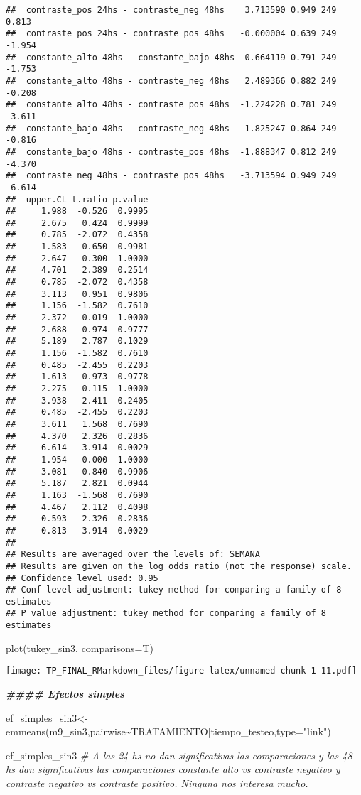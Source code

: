 \documentclass[
]{article}
\newenvironment{Shaded}{\begin{snugshade}}{\end{snugshade}}
\newcommand{\AttributeTok}[1]{\textcolor[rgb]{0.77,0.63,0.00}{#1}}
\newcommand{\CommentTok}[1]{\textcolor[rgb]{0.56,0.35,0.01}{\textit{#1}}}
\newcommand{\DocumentationTok}[1]{\textcolor[rgb]{0.56,0.35,0.01}{\textbf{\textit{#1}}}}
\newcommand{\FunctionTok}[1]{\textcolor[rgb]{0.00,0.00,0.00}{#1}}
\newcommand{\NormalTok}[1]{#1}
\newcommand{\OtherTok}[1]{\textcolor[rgb]{0.56,0.35,0.01}{#1}}
\newcommand{\SpecialCharTok}[1]{\textcolor[rgb]{0.00,0.00,0.00}{#1}}
\newcommand{\StringTok}[1]{\textcolor[rgb]{0.31,0.60,0.02}{#1}}
\begin{document}
\begin{verbatim}
##  contraste_pos 24hs - contraste_neg 48hs    3.713590 0.949 249    0.813
##  contraste_pos 24hs - contraste_pos 48hs   -0.000004 0.639 249   -1.954
##  constante_alto 48hs - constante_bajo 48hs  0.664119 0.791 249   -1.753
##  constante_alto 48hs - contraste_neg 48hs   2.489366 0.882 249   -0.208
##  constante_alto 48hs - contraste_pos 48hs  -1.224228 0.781 249   -3.611
##  constante_bajo 48hs - contraste_neg 48hs   1.825247 0.864 249   -0.816
##  constante_bajo 48hs - contraste_pos 48hs  -1.888347 0.812 249   -4.370
##  contraste_neg 48hs - contraste_pos 48hs   -3.713594 0.949 249   -6.614
##  upper.CL t.ratio p.value
##     1.988  -0.526  0.9995
##     2.675   0.424  0.9999
##     0.785  -2.072  0.4358
##     1.583  -0.650  0.9981
##     2.647   0.300  1.0000
##     4.701   2.389  0.2514
##     0.785  -2.072  0.4358
##     3.113   0.951  0.9806
##     1.156  -1.582  0.7610
##     2.372  -0.019  1.0000
##     2.688   0.974  0.9777
##     5.189   2.787  0.1029
##     1.156  -1.582  0.7610
##     0.485  -2.455  0.2203
##     1.613  -0.973  0.9778
##     2.275  -0.115  1.0000
##     3.938   2.411  0.2405
##     0.485  -2.455  0.2203
##     3.611   1.568  0.7690
##     4.370   2.326  0.2836
##     6.614   3.914  0.0029
##     1.954   0.000  1.0000
##     3.081   0.840  0.9906
##     5.187   2.821  0.0944
##     1.163  -1.568  0.7690
##     4.467   2.112  0.4098
##     0.593  -2.326  0.2836
##    -0.813  -3.914  0.0029
## 
## Results are averaged over the levels of: SEMANA 
## Results are given on the log odds ratio (not the response) scale. 
## Confidence level used: 0.95 
## Conf-level adjustment: tukey method for comparing a family of 8 estimates 
## P value adjustment: tukey method for comparing a family of 8 estimates
\end{verbatim}

\begin{Shaded}
\begin{Highlighting}[]
\FunctionTok{plot}\NormalTok{(tukey\_sin3, }\AttributeTok{comparisons=}\NormalTok{T)}
\end{Highlighting}
\end{Shaded}

\texttt{[image: TP\_FINAL\_RMarkdown\_files/figure-latex/unnamed-chunk-1-11.pdf]}

\begin{Shaded}
\begin{Highlighting}[]
\DocumentationTok{\#\#\#\# Efectos simples}

\NormalTok{ef\_simples\_sin3}\OtherTok{\textless{}{-}}\FunctionTok{emmeans}\NormalTok{(m9\_sin3,pairwise}\SpecialCharTok{\textasciitilde{}}\NormalTok{TRATAMIENTO}\SpecialCharTok{|}\NormalTok{tiempo\_testeo,}\AttributeTok{type=}\StringTok{"link"}\NormalTok{)}

\NormalTok{ef\_simples\_sin3 }\CommentTok{\# A las 24 hs no dan significativas las comparaciones y las 48 hs dan significativas las comparaciones constante alto vs contraste negativo y contraste negativo vs contraste positivo. Ninguna nos interesa mucho.}
\end{Highlighting}
\end{Shaded}
\end{document}
